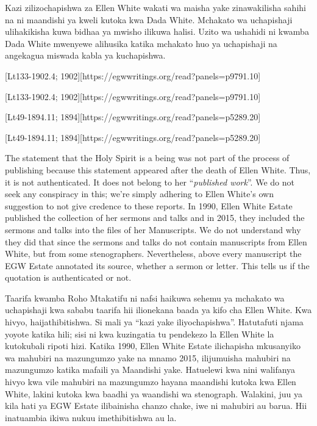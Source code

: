 Kazi zilizochapishwa za Ellen White wakati wa maisha yake zinawakilisha sahihi na ni maandishi ya kweli kutoka kwa Dada White. Mchakato wa uchapishaji ulihakikisha kuwa bidhaa ya mwisho ilikuwa halisi. Uzito wa ushahidi ni kwamba Dada White mwenyewe alihusika katika mchakato huo ya uchapishaji na angekagua miswada kabla ya kuchapishwa.


[Lt133-1902.4; 1902][https://egwwritings.org/read?panels=p9791.10]


[Lt133-1902.4; 1902][https://egwwritings.org/read?panels=p9791.10]


[Lt49-1894.11; 1894][https://egwwritings.org/read?panels=p5289.20]


[Lt49-1894.11; 1894][https://egwwritings.org/read?panels=p5289.20]


The statement that the Holy Spirit is a being was not part of the process of publishing because this statement appeared after the death of Ellen White. Thus, it is not authenticated. It does not belong to her “\textit{published work}”. We do not seek any conspiracy in this; we’re simply adhering to Ellen White’s own suggestion to not give credence to these reports. In 1990, Ellen White Estate published the collection of her sermons and talks and in 2015, they included the sermons and talks into the files of her Manuscripts. We do not understand why they did that since the sermons and talks do not contain manuscripts from Ellen White, but from some stenographers. Nevertheless, above every manuscript the EGW Estate annotated its source, whether a sermon or letter. This tells us if the quotation is authenticated or not.


Taarifa kwamba Roho Mtakatifu ni nafsi haikuwa sehemu ya mchakato wa uchapishaji kwa sababu taarifa hii ilionekana baada ya kifo cha Ellen White. Kwa hivyo, haijathibitishwa. Si mali ya “kazi yake iliyochapishwa”. Hatutafuti njama yoyote katika hili; sisi ni kwa kuzingatia tu pendekezo la Ellen White la kutokubali ripoti hizi. Katika 1990, Ellen White Estate ilichapisha mkusanyiko wa mahubiri na mazungumzo yake na mnamo 2015, ilijumuisha mahubiri na mazungumzo katika mafaili ya Maandishi yake. Hatuelewi kwa nini walifanya hivyo kwa vile mahubiri na mazungumzo hayana maandishi kutoka kwa Ellen White, lakini kutoka kwa baadhi ya waandishi wa stenograph. Walakini, juu ya kila hati ya EGW Estate ilibainisha chanzo chake, iwe ni mahubiri au barua. Hii inatuambia ikiwa nukuu imethibitishwa au la.


